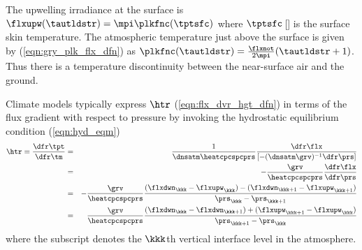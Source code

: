 \documentclass[12pt]{article}
\begin{document}
The upwelling irradiance at the surface is 
$\flxupw(\tautldstr) = \mpi\plkfnc(\tptsfc)$ where $\tptsfc$\,[\K] is the
surface skin temperature.
The atmospheric temperature just above the surface is given by
(\ref{eqn:gry_plk_flx_dfn}) as
$\plkfnc(\tautldstr) = \frac{\flxnot}{2\mpi}(\tautldstr + 1)$.
Thus there is a temperature discontinuity between the near-surface air
and the ground.

Climate models typically express $\htr$ (\ref{eqn:flx_dvr_hgt_dfn}) in 
terms of the flux gradient with respect to pressure by invoking the
hydrostatic equilibrium condition (\ref{eqn:hyd_eqm}) 
\begin{eqnarray}
\htr \equiv \frac{\dfr\tpt}{\dfr\tm} & = & 
\frac{1}{\dnsatm \heatcpcspcprs} \frac{\dfr\flx}{[-(\dnsatm\grv)^{-1}\dfr\prs]} \nonumber \\
& = & -\frac{\grv}{\heatcpcspcprs} \frac{\dfr\flx}{\dfr\prs} \\
& = & -\frac{\grv}{\heatcpcspcprs} 
\frac{(\flxdwn_{\kkk} - \flxupw_{\kkk})-(\flxdwn_{\kkk+1} - \flxupw_{\kkk+1})}
{\prs_{\kkk}-\prs_{\kkk+1}} \nonumber \\
& = & \frac{\grv}{\heatcpcspcprs} 
\frac{(\flxdwn_{\kkk} - \flxdwn_{\kkk+1}) + (\flxupw_{\kkk+1} - \flxupw_{\kkk})}
{\prs_{\kkk+1}-\prs_{\kkk}}
\label{eqn:flx_dvr_prs_dfn}
\end{eqnarray}
where the subscript denotes the $\kkk$th vertical interface level in
the atmosphere. 
\end{document}
